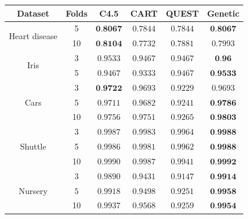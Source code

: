 \documentclass[english]{beamer}
\begin{document}
\begin{frame}{}
	\vspace{-1em}
	\begin{table}
		\begin{tabular}{|c|c|c|c|c|c|}
			\hline \textbf{Dataset} & \textbf{Folds} & \textbf{C4.5} & \textbf{CART} & \textbf{QUEST} & \textbf{Genetic} \\ \hline
			\multirow{2}{*}{Heart disease} & 5 & \underline{$\textbf{0.8067}$} & $0.7844$ & $0.7844$ & \underline{$\textbf{0.8067}$} \\
			& 10 & \underline{$\textbf{0.8104}$} & $0.7732$ & $0.7881$ & $0.7993$ \\ \hline
			\multirow{2}{*}{Iris} & 3 & $0.9533$ & $0.9467$ & $0.9467$ & \underline{$\textbf{0.96}$} \\ & 5 & $0.9467$ & $0.9333$ & $0.9467$ & \underline{$\textbf{0.9533}$} \\ \hline
			\multirow{3}{*}{Cars} & 3 & \underline{$\textbf{0.9722}$} & $0.9693$ & $0.9229$ & $0.9693$ \\
			& 5 & $0.9711$ & $0.9682$ & $0.9241$ & \underline{$\textbf{0.9786}$} \\
			& 10 & $0.9756$ & $0.9751$ & $0.9265$ & \underline{$\textbf{0.9803}$} \\ \hline
			\multirow{3}{*}{Shuttle} & 3 & $0.9987$ & $0.9983$ & $0.9964$ & \underline{$\textbf{0.9988}$}  \\
			& 5 & $0.9986$ & $0.9981$ & $0.9962$ & \underline{$\textbf{0.9988}$} \\
			& 10 & $0.9990$ & $0.9987$ & $0.9941 $ & \underline{$\textbf{0.9992}$} \\ \hline
			\multirow{3}{*}{Nursery} & 3 & $0.9890$ & $0.9431$ & $0.9147$ & \underline{$\textbf{0.9914}$} \\
			& $5$ & $0.9918$ & $0.9498$ & $0.9251$ & \underline{$\textbf{0.9958}$} \\
			& 10 & $0.9937$ & $0.9568$ & $0.9259$ & \underline{$\textbf{0.9954}$} \\ \hline
		\end{tabular}
	\end{table}
\end{frame}
\end{document}
